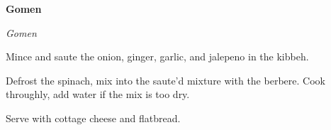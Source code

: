 \documentclass[../recipe-collections/cooking.tex]{subfiles}
\begin{document}
\begin{recipe}{\textbf{Gomen}}{}{}

  \freeform{}\textit{Gomen}


  Mince and saute the onion, ginger, garlic, and jalepeno in the kibbeh. 


  Defrost the spinach, mix into the saute'd mixture with the berbere. Cook throughly, add 
  water if the mix is too dry. 


  Serve with cottage cheese and flatbread.

  \freeform{}\hrulefill{}

\end{recipe}
\end{document}
